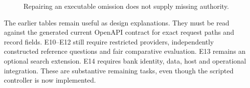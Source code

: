 \begin{figure}[H]
\centering
{}
\caption{Repairing an executable omission does not supply missing authority.}
\label{fig:encoding-repair-still-blocked}
\end{figure}

The earlier tables remain useful as design explanations. They must be read
against the generated current OpenAPI contract for exact request paths and
record fields. E10--E12 still require restricted providers, independently
constructed reference questions and fair comparative evaluation. E13 remains
an optional search extension. E14 requires bank identity, data, host and
operational integration. These are substantive remaining tasks, even though the
scripted controller is now implemented.
